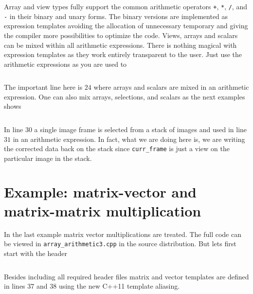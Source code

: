 Array and view types fully support the common arithmetic
operators \texttt{+}, \texttt{*}, \texttt{/}, and \texttt{-} in their binary and unary
forms. The binary versions are implemented as expression templates avoiding the
allocation of unnecessary temporary and giving the compiler more possibilities
to optimize the code. 
Views, arrays and scalars can be mixed within all arithmetic expressions. 
There is nothing magical with expression templates as they work entirely
transparent to the user. Just use the arithmetic expressions as you are used to
\inputminted[fontsize=\small,
             linenos,
             firstline=24,
             frame=lines,
             label=examples/array\_arithmetic1.cpp]
{cpp}{../examples/array_arithmetic1.cpp}
The important line here is $24$ where arrays and scalars are mixed in an
arithmetic expression.
One can also mix arrays, selections, and scalars as the next examples 
shows
\inputminted[fontsize=\small,
             linenos,
             firstline=24,
             frame=lines,
             label=examples/array\_arithmetic2.cpp]
{cpp}{../examples/array_arithmetic2.cpp}
In line $30$ a single image frame is selected from a stack of images and used in
line $31$ in an arithmetic expression. In fact, what we are doing here is,
we are writing the corrected data back on the stack since \texttt{curr\_frame} is
just a view on the particular image in the stack.

\section{Example: matrix-vector and matrix-matrix multiplication}
In the last example matrix vector multiplications are treated. The full code can
be viewed in \texttt{array\_arithmetic3.cpp} in the source distribution. But lets
first start with the header
\inputminted[fontsize=\small,
             linenos,
             firstline=24,
             lastline=39,
             firstnumber=24,
             frame=lines,
             label=examples/array\_arithmetic3.cpp]
{cpp}{../examples/array_arithmetic3.cpp}
Besides including all required header files matrix and vector templates are 
defined in lines $37$ and $38$ using the new C++11 template aliasing.

